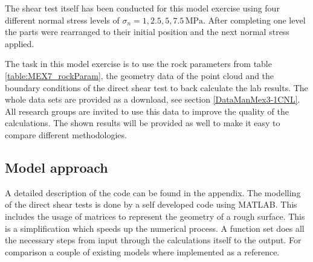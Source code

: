 
The shear test itself has been conducted for this model exercise using four different normal stress levels of $\sigma_n=1,2.5,5,7.5\,\text{MPa}$. After completing one level the parts were rearranged to their initial position and the next normal stress applied.

The task in this model exercise is to use the rock parameters from table \ref{table:MEX7_rockParam}, the geometry data of the point cloud and the boundary conditions of the direct shear test to back calculate the lab results. The whole data sets are provided as a download, see section \ref{DataManMex3-1CNL}. All research groups are invited to use this data to improve the quality of the calculations. The shown results will be provided as well to make it easy to compare different methodologies.
\subsection{Model approach}
A detailed description of the code can be found in the appendix.
%
The modelling of the direct shear tests is done by a self developed code using MATLAB. This includes the usage of matrices to represent the geometry of a rough surface. This is a simplification which speeds up the numerical process.
%
A function set does all the necessary steps from input through the calculations itself to the output. For comparison a couple of existing models where implemented as a reference.

